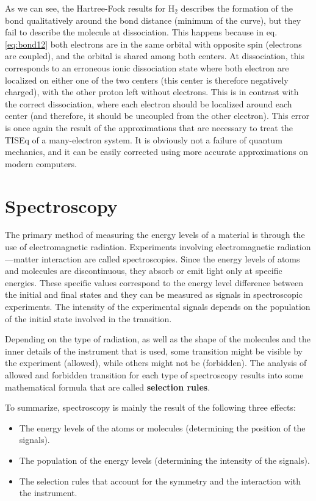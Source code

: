 \documentclass[
  9pt,
]{extbook}
\providecommand{\tightlist}{%
  \setlength{\itemsep}{0pt}\setlength{\parskip}{0pt}}
\theoremstyle{definition}
\theoremstyle{definition}
\theoremstyle{definition}
\theoremstyle{remark}
\begin{document}
As we can see, the Hartree-Fock results for \(\mathrm{H}_2\) describes the formation of the bond qualitatively around the bond distance (minimum of the curve), but they fail to describe the molecule at dissociation. This happens because in eq. \eqref{eq:bond12} both electrons are in the same orbital with opposite spin (electrons are coupled), and the orbital is shared among both centers. At dissociation, this corresponds to an erroneous ionic dissociation state where both electron are localized on either one of the two centers (this center is therefore negatively charged), with the other proton left without electrons. This is in contrast with the correct dissociation, where each electron should be localized around each center (and therefore, it should be uncoupled from the other electron). This error is once again the result of the approximations that are necessary to treat the TISEq of a many-electron system. It is obviously not a failure of quantum mechanics, and it can be easily corrected using more accurate approximations on modern computers.

\hypertarget{Spectroscopy}{%
\chapter{Spectroscopy}\label{Spectroscopy}}

The primary method of measuring the energy levels of a material is through the use of electromagnetic radiation. Experiments involving electromagnetic radiation---matter interaction are called spectroscopies. Since the energy levels of atoms and molecules are discontinuous, they absorb or emit light only at specific energies. These specific values correspond to the energy level difference between the initial and final states and they can be measured as signals in spectroscopic experiments. The intensity of the experimental signals depends on the population of the initial state involved in the transition.

Depending on the type of radiation, as well as the shape of the molecules and the inner details of the instrument that is used, some transition might be visible by the experiment (allowed), while others might not be (forbidden). The analysis of allowed and forbidden transition for each type of spectroscopy results into some mathematical formula that are called \textbf{selection rules}.

To summarize, spectroscopy is mainly the result of the following three effects:

\begin{itemize}
\tightlist
\item
  The energy levels of the atoms or molecules (determining the position of the signals).
\item
  The population of the energy levels (determining the intensity of the signals).
\item
  The selection rules that account for the symmetry and the interaction with the instrument.
\end{itemize}
\end{document}
